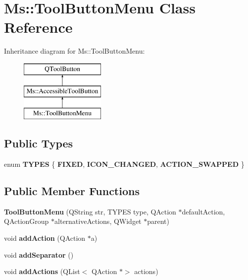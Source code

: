 \hypertarget{class_ms_1_1_tool_button_menu}{}\section{Ms\+:\+:Tool\+Button\+Menu Class Reference}
\label{class_ms_1_1_tool_button_menu}
Inheritance diagram for Ms\+:\+:Tool\+Button\+Menu\+:\begin{figure}[H]
\begin{center}
\leavevmode
\includegraphics[height=3.000000cm]{class_ms_1_1_tool_button_menu}
\end{center}
\end{figure}
\subsection*{Public Types}
\begin{DoxyCompactItemize}
\item 
\mbox{\label{class_ms_1_1_tool_button_menu_a5617357b1b3ccdc97e79c8e5105ee925}} 
enum {\bfseries T\+Y\+P\+ES} \{ {\bfseries F\+I\+X\+ED}, 
{\bfseries I\+C\+O\+N\+\_\+\+C\+H\+A\+N\+G\+ED}, 
{\bfseries A\+C\+T\+I\+O\+N\+\_\+\+S\+W\+A\+P\+P\+ED}
 \}
\end{DoxyCompactItemize}
\subsection*{Public Member Functions}
\begin{DoxyCompactItemize}
\item 
\mbox{\label{class_ms_1_1_tool_button_menu_a7595d2183e2eaf6e4474fa2afa715c23}} 
{\bfseries Tool\+Button\+Menu} (Q\+String str, T\+Y\+P\+ES type, Q\+Action $\ast$default\+Action, Q\+Action\+Group $\ast$alternative\+Actions, Q\+Widget $\ast$parent)
\item 
\mbox{\label{class_ms_1_1_tool_button_menu_af33e4fdc182fcab2a0b7e6c6a20c0298}} 
void {\bfseries add\+Action} (Q\+Action $\ast$a)
\item 
\mbox{\label{class_ms_1_1_tool_button_menu_a31d191724d6aa40b3af1fb51acc916c6}} 
void {\bfseries add\+Separator} ()
\item 
\mbox{\label{class_ms_1_1_tool_button_menu_ad329ed609a8b1fe2eb0b10a123af4134}} 
void {\bfseries add\+Actions} (Q\+List$<$ Q\+Action $\ast$$>$ actions)
\end{DoxyCompactItemize}
